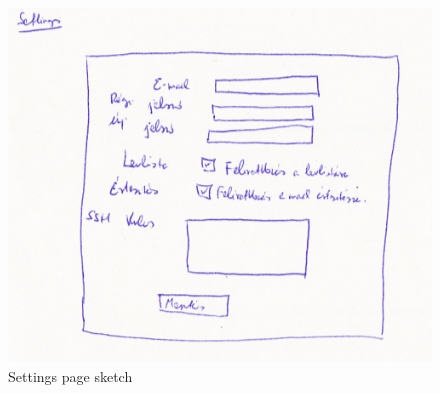 \begin{figure}[!ht]
	\includegraphics[width=\textwidth]{figures/sketch1.png}
	\caption{Settings page sketch}
	\label{fig:sketch1}
\end{figure}